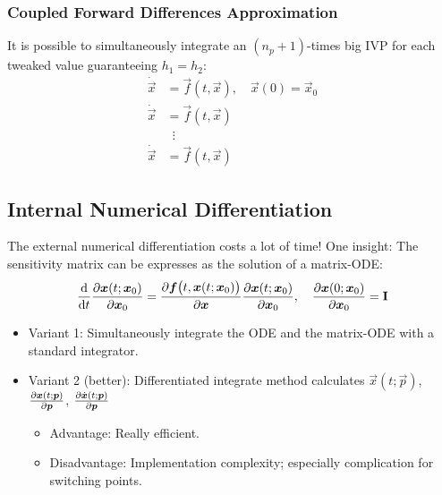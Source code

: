 			\subsubsection{Coupled Forward Differences Approximation}
				It is possible to simultaneously integrate an \( (n_p + 1) \)-times big IVP for each tweaked value guaranteeing \( h_1 = h_2 \):
				\begin{align*}
					\dot{\vec{x}} & = \vec{f}(t, \vec{x}),\quad \vec{x}(0) = \vec{x}_0 \\
					\dot{\vec{x}} & = \vec{f}(t, \vec{x})                              \\
					              & \,\,\,\vdots                                       \\
					\dot{\vec{x}} & = \vec{f}(t, \vec{x})
				\end{align*}

		\subsection{Internal Numerical Differentiation}
			The external numerical differentiation costs a lot of time! One insight: The sensitivity matrix can be expresses as the solution of a matrix-ODE:
			\begin{align*}
				\dv{t} \pdv{\bm{x}(t; \bm{x}_0)}{\bm{x}_0} = \pdv{\bm{f}\big(t, \bm{x}(t; \bm{x}_0)\big)}{\bm{x}} \pdv{\bm{x}(t; \bm{x}_0)}{\bm{x}_0},\quad \pdv{\bm{x}(0; \bm{x}_0)}{\bm{x}_0} = \bm{\mathrm{I}}
			\end{align*}

			\begin{itemize}
				\item Variant 1: Simultaneously integrate the ODE and the matrix-ODE with a standard integrator.
				\item Variant 2 (better): Differentiated integrate method calculates \( \vec{x}(t; \vec{p}) \), \( \pdv{\bm{x}(t; \bm{p})}{\bm{p}} \), \( \pdv{\dot{\bm{x}}(t; \bm{p})}{\bm{p}} \)
					\begin{itemize}
						\item Advantage: Really efficient.
						\item Disadvantage: Implementation complexity; especially complication for switching points.
					\end{itemize}
			\end{itemize}

